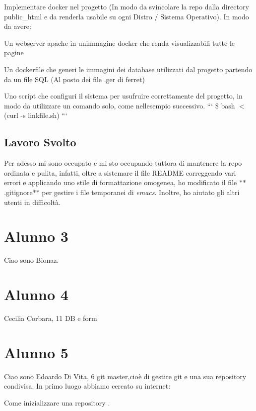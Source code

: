 \begin{DoxyItemize}
\item Implementare docker nel progetto (In modo da svincolare la repo dalla directory public\+\_\+html e da renderla usabile su ogni Distro / Sistema Operativo). In modo da avere\+:
\begin{DoxyItemize}
\item Un webserver apache in un\textquotesingle{}immagine docker che renda visualizzabili tutte le pagine
\item Un dockerfile che generi le immagini dei database utilizzati dal progetto partendo da un file S\+QL (Al posto dei file .ger di ferret)
\end{DoxyItemize}
\item Uno script che configuri il sistema per usufruire correttamente del progetto, in modo da utilizzare un comando solo, come nell\textquotesingle{}esempio successivo. ``` \$ bash $<$(curl -\/s linkfile.\+sh) ``` \subsection*{Lavoro Svolto}
\end{DoxyItemize}

Per adesso mi sono occupato e mi sto occupando tuttora di mantenere la repo ordinata e pulita, infatti, oltre a sistemare il file R\+E\+A\+D\+ME correggendo vari errori e applicando uno stile di formattazione omogenea, ho modificato il file $\ast$$\ast$.gitignore$\ast$$\ast$ per gestire i file temporanei di {\itshape emacs}. Inoltre, ho aiutato gli altri utenti in difficoltà. \section*{Alunno 3}

Ciao sono Bionaz. \section*{Alunno 4}

Cecilia Corbara, 11 DB e form \section*{Alunno 5}

Ciao sono Edoardo Di Vita, 6 git master,cioè di gestire git e una sua repository condivisa. In primo luogo abbiamo cercato su internet\+:

Come inizializzare una repository .


